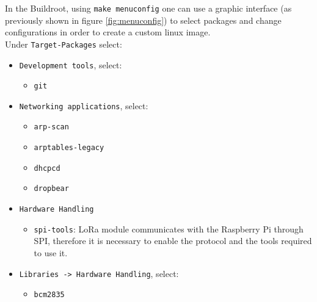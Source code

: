In the Buildroot, using \verb|make menuconfig| one can use a graphic interface (as previously shown in figure \ref{fig:menuconfig}) to select packages and change configurations in order to create a custom linux image.\\

Under \verb|Target-Packages| select:
\begin{itemize}
	\item \verb|Development tools|, select:
	\begin{itemize}
		\item \verb|git|
	\end{itemize}

	\item \verb|Networking applications|, select:
	\begin{itemize}
		\item \verb|arp-scan|
		\item \verb|arptables-legacy|
		\item \verb|dhcpcd|
		\item \verb|dropbear|
	\end{itemize}

	\item \verb|Hardware Handling|
	\begin{itemize}
		\item \verb|spi-tools|: LoRa module communicates with the Raspberry Pi through SPI, therefore it is necessary to  enable the protocol and the tools required to use it.
	\end{itemize}
	
	\item \verb|Libraries -> Hardware Handling|, select:
	\begin{itemize}
		\item \verb|bcm2835|
	\end{itemize}	
\end{itemize}
